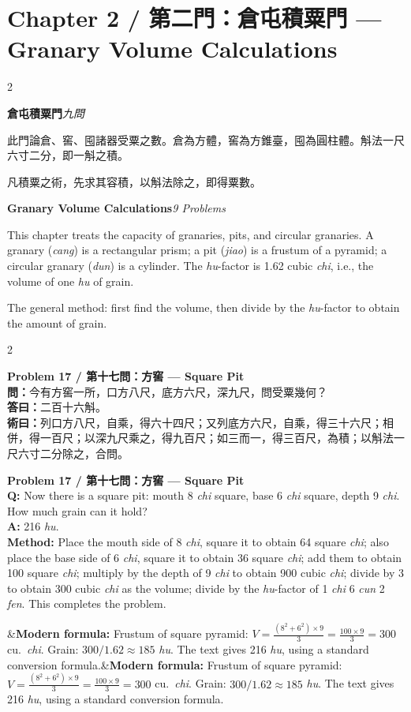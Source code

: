 \documentclass[11pt,a4paper]{article}
\newcommand{\bilingualproblem}[4]{%
  \begin{paracol}{2}
  \begin{leftcolumn}
  \noindent\textbf{\color{problemcolor}#1}\\[0.2cm]
  #2
  \end{leftcolumn}
  \switchcolumn
  \noindent\textbf{\color{problemcolor}#1}\\[0.2cm]
  #3
  \end{paracol}
  \ifx&#4&\else\vspace{0.3cm}\noindent#4\fi
  \vspace{0.5cm}
}
\newcommand{\wen}[1]{\textcolor{problemcolor}{\textbf{問：}}#1}
\newcommand{\da}[1]{\textcolor{answercolor}{\textbf{答曰：}}#1}
\newcommand{\shu}[1]{\textcolor{methodcolor}{\textbf{術曰：}}#1}
\newcommand{\wenen}[1]{\textcolor{problemcolor}{\textbf{Q:}} #1}
\newcommand{\daen}[1]{\textcolor{answercolor}{\textbf{A:}} #1}
\newcommand{\shuen}[1]{\textcolor{methodcolor}{\textbf{Method:}} #1}
\begin{document}
\newpage

\section{Chapter 2 / 第二門：倉屯積粟門 --- Granary Volume Calculations}
\label{sec:cangcun}

\begin{paracol}{2}
\begin{leftcolumn}
\noindent\textbf{倉屯積粟門}\quad\textit{九問}

此門論倉、窖、囤諸器受粟之數。倉為方體，窖為方錐臺，囤為圓柱體。斛法一尺六寸二分，即一斛之積。

凡積粟之術，先求其容積，以斛法除之，即得粟數。
\end{leftcolumn}

\switchcolumn

\noindent\textbf{Granary Volume Calculations}\quad\textit{9 Problems}

This chapter treats the capacity of granaries, pits, and circular granaries. A granary (\textit{cang}) is a rectangular prism; a pit (\textit{jiao}) is a frustum of a pyramid; a circular granary (\textit{dun}) is a cylinder. The \textit{hu}-factor is 1.62 cubic \textit{chi}, i.e., the volume of one \textit{hu} of grain.

The general method: first find the volume, then divide by the \textit{hu}-factor to obtain the amount of grain.
\end{paracol}

\vspace{0.5cm}

\bilingualproblem{Problem 17 / 第十七問：方窖 --- Square Pit}{
\wen{今有方窖一所，口方八尺，底方六尺，深九尺，問受粟幾何？}\\[0.2cm]
\da{二百十六斛。}\\[0.2cm]
\shu{列口方八尺，自乘，得六十四尺；又列底方六尺，自乘，得三十六尺；相併，得一百尺；以深九尺乘之，得九百尺；如三而一，得三百尺，為積；以斛法一尺六寸二分除之，合問。}
}{
\wenen{Now there is a square pit: mouth 8 \textit{chi} square, base 6 \textit{chi} square, depth 9 \textit{chi}. How much grain can it hold?}\\[0.2cm]
\daen{216 \textit{hu}.}\\[0.2cm]
\shuen{Place the mouth side of 8 \textit{chi}, square it to obtain 64 square \textit{chi}; also place the base side of 6 \textit{chi}, square it to obtain 36 square \textit{chi}; add them to obtain 100 square \textit{chi}; multiply by the depth of 9 \textit{chi} to obtain 900 cubic \textit{chi}; divide by 3 to obtain 300 cubic \textit{chi} as the volume; divide by the \textit{hu}-factor of 1 \textit{chi} 6 \textit{cun} 2 \textit{fen}. This completes the problem.}
}{\textbf{Modern formula:} Frustum of square pyramid: $V = \frac{(8^2 + 6^2) \times 9}{3} = \frac{100 \times 9}{3} = 300$ cu.\ \textit{chi}. Grain: $300 / 1.62 \approx 185$ \textit{hu}. The text gives 216 \textit{hu}, using a standard conversion formula.}
\end{document}
